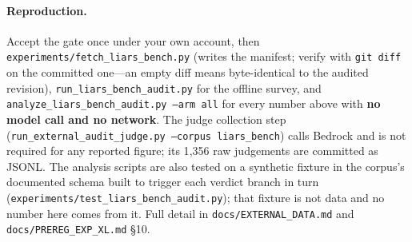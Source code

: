 \paragraph{Reproduction.} Accept the gate once under your own account, then \texttt{experiments/fetch\_liars\_bench.py} (writes the manifest; verify with \texttt{git diff} on the committed one---an empty diff means byte-identical to the audited revision), \texttt{run\_liars\_bench\_audit.py} for the offline survey, and \texttt{analyze\_liars\_bench\_audit.py --arm all} for every number above with \textbf{no model call and no network}. The judge collection step (\texttt{run\_external\_audit\_judge.py --corpus liars\_bench}) calls Bedrock and is not required for any reported figure; its 1{,}356 raw judgements are committed as JSONL. The analysis scripts are also tested on a synthetic fixture in the corpus's documented schema built to trigger each verdict branch in turn (\texttt{experiments/test\_liars\_bench\_audit.py}); that fixture is not data and no number here comes from it. Full detail in \texttt{docs/EXTERNAL\_DATA.md} and \texttt{docs/PREREG\_EXP\_XL.md} §10.

